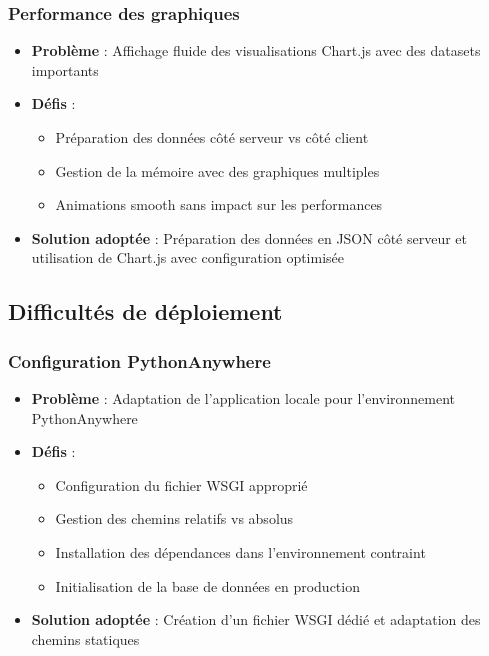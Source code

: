 \documentclass[a4paper,11pt]{article}
\begin{document}
            \subsubsection{Performance des graphiques}
                \begin{itemize}
                    \item \textbf{Problème} : Affichage fluide des visualisations Chart.js avec des datasets importants
                    \item \textbf{Défis} :
                        \begin{itemize}
                            \item Préparation des données côté serveur vs côté client
                            \item Gestion de la mémoire avec des graphiques multiples
                            \item Animations smooth sans impact sur les performances
                        \end{itemize}
                    \item \textbf{Solution adoptée} : Préparation des données en JSON côté serveur et utilisation de Chart.js avec configuration optimisée
                \end{itemize}

        \subsection{Difficultés de déploiement}

            \subsubsection{Configuration PythonAnywhere}
                \begin{itemize}
                    \item \textbf{Problème} : Adaptation de l'application locale pour l'environnement PythonAnywhere
                    \item \textbf{Défis} :
                        \begin{itemize}
                            \item Configuration du fichier WSGI approprié
                            \item Gestion des chemins relatifs vs absolus
                            \item Installation des dépendances dans l'environnement contraint
                            \item Initialisation de la base de données en production
                        \end{itemize}
                    \item \textbf{Solution adoptée} : Création d'un fichier WSGI dédié et adaptation des chemins statiques
                \end{itemize}
\end{document}
